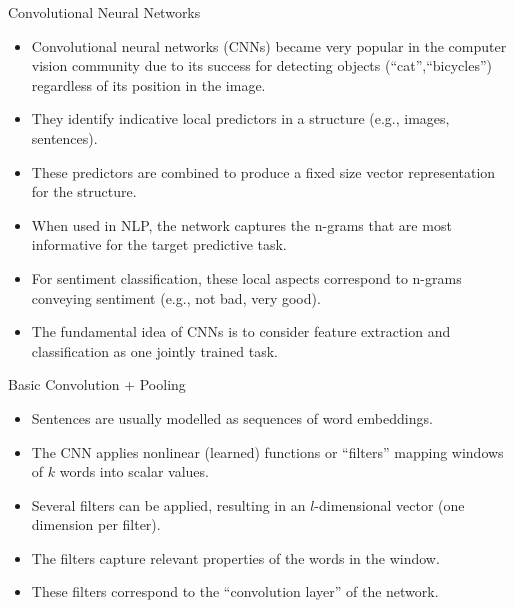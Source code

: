 

\begin{frame}{Convolutional Neural Networks}
\begin{scriptsize}
\begin{itemize}
\item Convolutional neural networks (CNNs) became very popular in the computer vision community due to its success for detecting objects (``cat'',``bicycles'') regardless of its position in the image.
\item They identify indicative local predictors in a structure (e.g., images, sentences).
\item These predictors are combined to produce a fixed size vector representation for the structure.
\item When used in NLP, the network captures the n-grams that are most informative for the target predictive task.
\item For sentiment classification, these local aspects correspond to n-grams conveying sentiment (e.g., not bad, very good).
\item The fundamental idea of CNNs \cite{lecun1998gradient}  is  to  consider  feature extraction and classification as one jointly trained task. 

\end{itemize}
\end{scriptsize}
\end{frame}

\begin{frame}{Basic Convolution  + Pooling}
\begin{scriptsize}
\begin{itemize}
\item Sentences are usually modelled as sequences of word embeddings.
\item The CNN applies  nonlinear (learned) functions or ``filters'' mapping windows of $k$ words into scalar values.
\item Several filters can be applied, resulting in an $l$-dimensional vector (one dimension per filter).
\item The filters capture relevant properties of the words in the window.
\item These filters correspond to the ``convolution layer'' of the network.
\end{itemize}
\end{scriptsize}
\end{frame}

